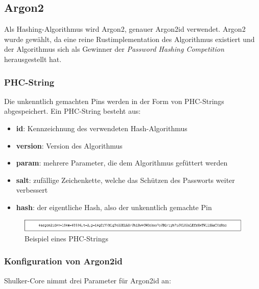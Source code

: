 \subsection{Argon2}
Als Hashing-Algorithmus wird Argon2, genauer Argon2id verwendet. Argon2 wurde gewählt, da eine reine Rustimplementation des Algorithmus
existiert und der Algorithmus sich als Gewinner der \textit{Password Hashing Competition} herausgestellt hat.\cite{passwordhashingcmp}

\subsubsection{PHC-String}
Die unkenntlich gemachten Pins werden in der Form von PHC-Strings abgespeichert. Ein PHC-String besteht aus:
\begin{itemize}
    \item \textbf{id}: Kennzeichnung des verwendeten Hash-Algorithmus
    \item \textbf{version}: Version des Algorithmus
    \item \textbf{param}: mehrere Parameter, die dem Algorithmus gefüttert werden
    \item \textbf{salt}: zufällige Zeichenkette, welche das Schützen des Passworts weiter verbessert
    \item \textbf{hash}: der eigentliche Hash, also der unkenntlich gemachte Pin
\end{itemize}
\begin{figure}[H]
    \begin{center}
        \includegraphics[width=1\textwidth]{images/core/phc_string.png}
        \caption{Beispiel eines PHC-Strings}
    \end{center}
\end{figure}
\cite{phcstring}

\subsubsection{Konfiguration von Argon2id}
Shulker-Core nimmt drei Parameter für Argon2id an:

